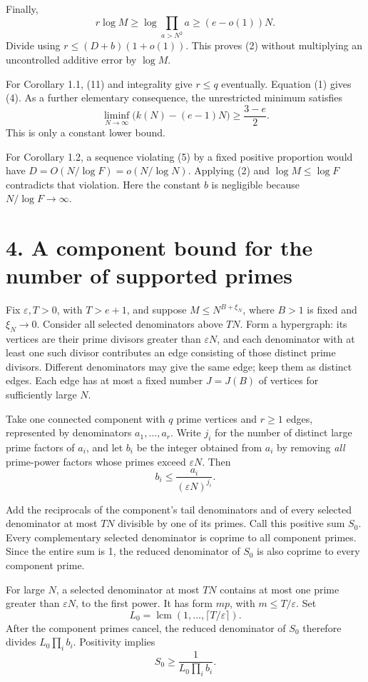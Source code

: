 \documentclass[11pt]{article}
\begin{document}
Finally,
\[
r\log M\ge\log\prod_{a>N^2}a\ge(e-o(1))N.
\]
Divide using \(r\le(D+b)(1+o(1))\). This proves (2) without multiplying an uncontrolled additive error by \(\log M\).

For Corollary 1.1, (11) and integrality give \(r\le q\) eventually. Equation (1) gives (4). As a further elementary consequence, the unrestricted minimum satisfies
\[
\liminf_{N\to\infty}\bigl(k(N)-(e-1)N\bigr)\ge\frac{3-e}{2}.
\]
This is only a constant lower bound.

For Corollary 1.2, a sequence violating (5) by a fixed positive proportion would have \(D=O(N/\log F)=o(N/\log N)\). Applying (2) and \(\log M\le\log F\) contradicts that violation. Here the constant \(b\) is negligible because \(N/\log F\to\infty\).

\section*{4. A component bound for the number of supported primes}

Fix \(\varepsilon,T>0\), with \(T>e+1\), and suppose \(M\le N^{B+\xi_N}\), where \(B>1\) is fixed and \(\xi_N\to0\). Consider all selected denominators above \(TN\). Form a hypergraph: its vertices are their prime divisors greater than \(\varepsilon N\), and each denominator with at least one such divisor contributes an edge consisting of those distinct prime divisors. Different denominators may give the same edge; keep them as distinct edges. Each edge has at most a fixed number \(J=J(B)\) of vertices for sufficiently large \(N\).

Take one connected component with \(q\) prime vertices and \(r\ge1\) edges, represented by denominators \(a_1,\ldots,a_r\). Write \(j_i\) for the number of distinct large prime factors of \(a_i\), and let \(b_i\) be the integer obtained from \(a_i\) by removing \emph{all} prime-power factors whose primes exceed \(\varepsilon N\). Then
\[
b_i\le\frac{a_i}{(\varepsilon N)^{j_i}}. \tag{12a}
\]

Add the reciprocals of the component's tail denominators and of every selected denominator at most \(TN\) divisible by one of its primes. Call this positive sum \(S_0\). Every complementary selected denominator is coprime to all component primes. Since the entire sum is 1, the reduced denominator of \(S_0\) is also coprime to every component prime.

For large \(N\), a selected denominator at most \(TN\) contains at most one prime greater than \(\varepsilon N\), to the first power. It has form \(mp\), with \(m\le T/\varepsilon\). Set
\[
L_0=\operatorname{lcm}(1,\ldots,\lceil T/\varepsilon\rceil).
\]
After the component primes cancel, the reduced denominator of \(S_0\) therefore divides \(L_0\prod_i b_i\). Positivity implies
\[
S_0\ge\frac1{L_0\prod_i b_i}. \tag{12b}
\]
\end{document}
